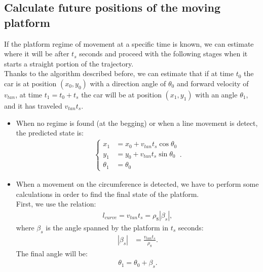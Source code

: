 \subsection{Calculate future positions of the moving platform}
If the platform regime of movement at a specific time is known, we can estimate where it will be after $t_s$ seconds and proceed with the following stages when it starts a straight portion of the trajectory.\\
Thanks to the algorithm described before, we can estimate that if at time $t_0$ the car is at position $(x_0,y_0)$ with a direction angle of $\theta_0$ and forward velocity of $v_{tan}$, at time $t_1 = t_0 + t_s$ the car will be at position $(x_1,y_1)$ with an angle  $\theta_1$, and it has traveled  $v_{tan}t_s$.
\begin{itemize}
\item When no regime is found (at the begging) or when a line movement is detect, the predicted state is:
\begin{align}
\begin{cases}
x_1 &= x_0 + v_{tan}t_s\cos{\theta_0}\\[5pt]
y_1 &= y_0 + v_{tan}t_s\sin{\theta_0}\\[5pt]
\theta_1 &= \theta_0
\end{cases}.
\label{eq:line_future_pose}
\end{align}
\item When a movement on the circumference is detected, we have to perform some calculations in order to find the final state of the platform.\\ 
First, we use the relation:
\begin{align}
l_{curve} = v_{tan}t_s = \rho_8|\beta_s|,
\end{align}
where $\beta_s$ is the angle spanned by the platform in $t_s$ seconds:
\begin{align}
|\beta_{s}| &= \frac{v_{tan}t_s}{\rho_8}.
 \label{eq:anglespanned}
\end{align}
The final angle will be:
 \begin{align}
 \theta_1 = \theta_0 + \beta_s.
 \label{eq:anglefinal}
 \end{align}


\end{itemize}
